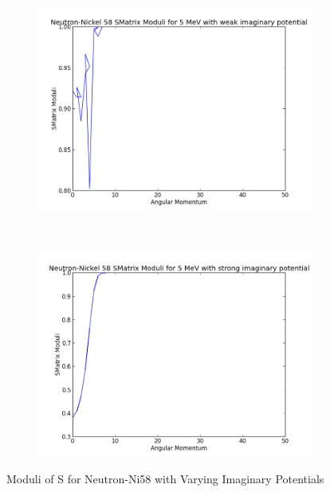 \documentclass[paper=a4, fontsize=11pt]{scrartcl} %
\numberwithin{equation}{section} %
\numberwithin{figure}{section} %
\numberwithin{table}{section} %
\begin{document}
 \begin{figure}[hbt!]
        \centering
        \begin{subfigure}[b!]{0.35\textwidth}
                \includegraphics[width=\textwidth]{NeutronWeaks.png}
        \end{subfigure}%
        ~ %
\quad
        \begin{subfigure}[b!]{0.35\textwidth}
                \includegraphics[width=\textwidth]{NeutronStrongs.png}
        \end{subfigure}

        \caption{Moduli of S for Neutron-Ni58 with Varying Imaginary Potentials}
\end{figure}
\end{document}
